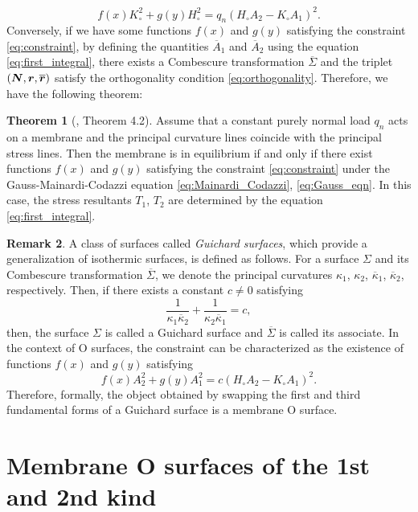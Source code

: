 \documentclass[a4paper]{amsart}
\def\br{\mbox{\boldmath $r$}}
\def\bN{\mbox{\boldmath $N$}}
\theoremstyle{definition}
\newtheorem{thm}{Theorem}[section]
\newtheorem{rmk}[thm]{Remark}
\begin{document}
\begin{equation}
\label{eq:constraint}
f(x)K_\circ^2 + g(y) H_\circ^2 = q_n (H_\circ A_2 - K_\circ A_1)^2.
\end{equation}
Conversely, if we have some functions $f(x)$ and $g(y)$ satisfying the constraint \eqref{eq:constraint}, by defining the quantities $\overline{A}_1$ and $\overline{A}_2$ using the equation \eqref{eq:first_integral}, there exists a Combescure transformation $\overline{\Sigma}$ and the triplet $(\bN, \br, \overline{\br})$ satisfy the orthogonality condition \eqref{eq:orthogonality}.
Therefore, we have the following theorem:
%
\begin{thm}[\cite{RogersSchief}, Theorem 4.2]
Assume that a constant purely normal load $q_n$ acts on a membrane and the principal curvature lines coincide with the principal stress lines. 
Then the membrane is in equilibrium if and only if there exist functions $f(x)$ and $g(y)$ satisfying the constraint \eqref{eq:constraint} under the Gauss-Mainardi-Codazzi equation \eqref{eq:Mainardi_Codazzi}, \eqref{eq:Gauss_eqn}.
In this case, the stress resultants $T_1$, $T_2$ are determined by the equation \eqref{eq:first_integral}.
\end{thm}
%
\begin{rmk}
A class of surfaces called \textit{Guichard surfaces}, which provide a generalization of isothermic surfaces, is defined as follows.
For a surface $\Sigma$ and its Combescure transformation $\overline{\Sigma}$, we denote the principal curvatures $\kappa_1$, $\kappa_2$, $\overline{\kappa}_1$, $\overline{\kappa}_2$, respectively.
Then, if there exists a constant $c \neq 0$ satisfying
\begin{equation}
\frac{1}{\kappa_1\overline{\kappa}_2} + \frac{1}{\kappa_2\overline{\kappa}_1} = c,
\end{equation}
then, the surface $\Sigma$ is called a Guichard surface and $\overline{\Sigma}$ is called its associate.
In the context of O surfaces, the constraint can be characterized as the existence of functions $f(x)$ and $g(y)$ satisfying
\begin{equation}
f(x)A_2^2 + g(y) A_1^2 = c (H_\circ A_2 - K_\circ A_1)^2.
\end{equation}
Therefore, formally, the object obtained by swapping the first and third fundamental forms of a Guichard surface is a membrane O surface.
\end{rmk}

\section{Membrane O surfaces of the 1st and 2nd kind}
\label{sec:1st_2nd_kind}
\end{document}
